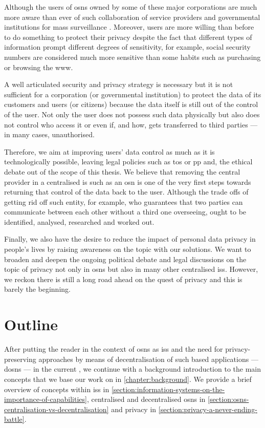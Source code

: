 \documentclass[showtrims,oldfontcommands]{kthesis}
\begin{document}
Although the users of \acp{osn} owned by some of these major corporations are much more 
aware than ever of such collaboration of service providers and governmental institutions 
for mass surveillance \cite{Madden14}. Moreover, users are more willing than before 
to do something to protect their privacy despite the fact that different types of 
information prompt different degrees of sensitivity, for example, social security 
numbers are considered much more sensitive than some habits such as purchasing or 
browsing the \ac{www}.

A well articulated security and privacy strategy is necessary but it is not sufficient 
for a corporation (or governmental institution) to protect the data of its customers 
and users (or citizens) because the data itself is still out of the control of the 
user. Not only the user does not possess such data physically but also does not 
control who access it or even if, and how, gets transferred to third parties --- 
in many cases, unauthorised.

Therefore, we aim at improving users' data control as much as it is technologically 
possible, leaving legal policies such as \ac{tos} or \ac{pp} and, the ethical debate 
out of the scope of this thesis. We believe that removing the central provider in 
a centralised \ac{is} such as an \ac{osn} is one of the very first steps towards 
returning that control of the data back to the user. Although the trade offs of 
getting rid off such entity, for example, who guarantees that two parties can communicate 
between each other without a third one overseeing, ought to be identified, analysed, 
researched and worked out.

Finally, we also have the desire to reduce the impact of personal data privacy in 
people's lives by raising awareness on the topic with our solutions. We want to 
broaden and deepen the ongoing political debate and legal discussions on the topic 
of privacy not only in \acp{osn} but also in many other centralised \acp{is}. However, 
we reckon there is still a long road ahead on the quest of privacy and this is barely 
the beginning.

\section{Outline}
    \label{section:outline}
After putting the reader in the context of \acp{osn} as \acp{is} and the need for 
privacy-preserving approaches by means of decentralisation of such \Internet based 
applications --- \acp{dosn} --- in the current , 
we continue with a background introduction to the main concepts that we base our 
work on in \cref{chapter:background}. We provide a brief overview of concepts within 
\acp{is} in \cref{section:information-systems-on-the-importance-of-capabilities}, 
centralised and decentralised \acp{osn} in \cref{section:osns-centralisation-vs-decentralisation} 
and privacy in \cref{section:privacy-a-never-ending-battle}.
\end{document}
